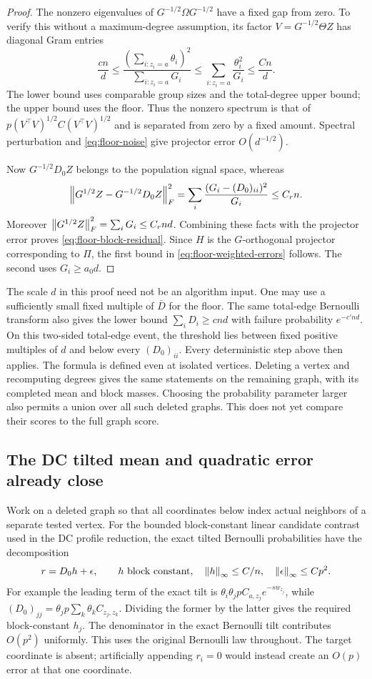 \begin{proof}
The nonzero eigenvalues of $G^{-1/2}\Omega G^{-1/2}$ have a fixed
gap from zero. To verify this without a maximum-degree assumption, its
factor $V=G^{-1/2}\Theta Z$ has diagonal Gram entries
\[
 \frac{cn}{d}
 \le
 \frac{(\sum_{i:z_i=a}\theta_i)^2}{\sum_{i:z_i=a}G_i}
 \le \sum_{i:z_i=a}\frac{\theta_i^2}{G_i}
 \le\frac{Cn}{d}.
\]
The lower bound uses comparable group sizes and the total-degree
upper bound; the upper bound uses the floor. Thus the nonzero spectrum
is that of $p(V^\top V)^{1/2}C(V^\top V)^{1/2}$ and is separated
from zero by a fixed amount. Spectral perturbation and
\eqref{eq:floor-noise} give projector error $O(d^{-1/2})$.

Now $G^{-1/2}D_0Z$ belongs to the population signal space, whereas
\[
 \left\lVert G^{1/2}Z-G^{-1/2}D_0Z\right\rVert_F^2
 =\sum_i\frac{(G_i-(D_0)_{ii})^2}{G_i}\le C_rn.
\]
Moreover $\left\lVert G^{1/2}Z\right\rVert_F^2=\sum_iG_i\le C_rnd$.
Combining these facts with the projector error proves
\eqref{eq:floor-block-residual}. Since $H$ is the $G$-orthogonal
projector corresponding to $\Pi$, the first bound in
\eqref{eq:floor-weighted-errors} follows. The second uses $G_i\ge a_0d$.
\end{proof}

The scale $d$ in this proof need not be an algorithm input. One may use
a sufficiently small fixed multiple of $\bar D$ for the floor. The
same total-edge Bernoulli transform also gives the lower bound
$\sum_iD_i\ge cnd$ with failure probability $e^{-c'nd}$.
On this two-sided total-edge event, the threshold lies between fixed positive
multiples of $d$ and below every $(D_0)_{ii}$. Every deterministic step
above then applies. The formula is defined even at isolated vertices.
Deleting a vertex and recomputing degrees gives the same statements on
the remaining graph, with its completed mean and block masses. Choosing
the probability parameter larger also permits a union over all such
deleted graphs. This does not yet compare their scores to the full
graph score.

\subsection{The DC tilted mean and quadratic error already close}

Work on a deleted graph so that all coordinates below index actual
neighbors of a separate tested vertex. For the bounded block-constant
linear candidate contrast used in the DC profile reduction,
the exact tilted Bernoulli probabilities have the decomposition
\begin{equation}\label{eq:floor-tilt-decomposition}
 r=D_0h+\epsilon,\qquad
 h\text{ block constant},\quad
 \left\lVert h\right\rVert_\infty\le C/n,\quad \left\lVert\epsilon\right\rVert_\infty\le Cp^2.
\end{equation}
For example the leading term of the exact tilt is
$\theta_i\theta_jpC_{a,z_j}e^{-s w_{z_j}}$, while
$(D_0)_{jj}=\theta_jp\sum_k\theta_k C_{z_j,z_k}$.
Dividing the former by the latter gives the required block-constant
$h_j$. The denominator in the exact Bernoulli tilt contributes
$O(p^2)$ uniformly. This uses the original Bernoulli law throughout.
The target coordinate is absent; artificially appending $r_i=0$ would
instead create an $O(p)$ error at that one coordinate.

